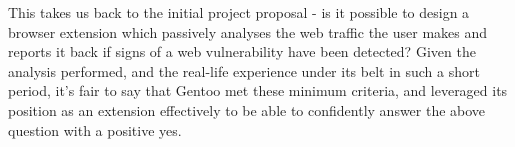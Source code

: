  This takes us back to the initial project proposal - is it possible to design a browser extension which passively analyses the web traffic the user makes and reports it back if signs of a web vulnerability have been detected? Given the analysis performed, and the real-life experience under its belt in such a short period, it's fair to say that Gentoo met these minimum criteria, and leveraged its position as an extension effectively to be able to confidently answer the above question with a positive yes.
 




































